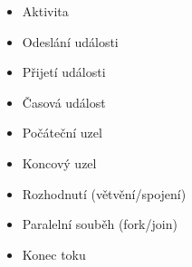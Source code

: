 \documentclass{szzclass}
\begin{document}
\begin{figure}[ht!]
\centering
\begin{minipage}{.5\textwidth}
\begin{itemize}
    \item Aktivita
    \item Odeslání události
    \item Přijetí události
    \item Časová událost
\end{itemize}
\end{minipage}%
\begin{minipage}{.5\textwidth}
\begin{itemize}
    \item Počáteční uzel
    \item Koncový uzel
    \item Rozhodnutí (větvění/spojení)
    \item Paralelní souběh (fork/join)
    \item Konec toku
\end{itemize}
\end{minipage}
\end{figure}
\end{document}
